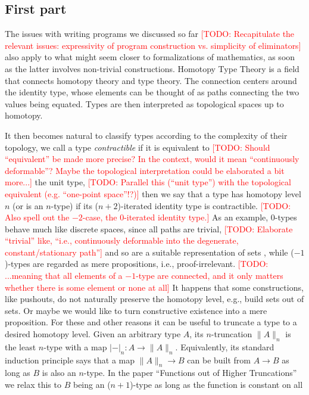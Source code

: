 \documentclass{book}
\newcommand{\TODO}[1]{\textcolor{red}{[TODO: #1]}}
\newcommand{\tr}[2]{\| #2 \|_{#1}}
\newcommand{\trcon}[2]{| #2 |_{#1}}
\begin{document}
\subsection{First part}
The issues with writing programs we discussed so far
\TODO{Recapitulate the relevant issues: expressivity of program construction vs. simplicity of eliminators}
also apply to
what might seem closer to formalizations of mathematics, as soon as the
latter involves non-trivial constructions.
Homotopy Type Theory \cite{hottbook} is a field that connects homotopy theory and type theory.
The connection centers around the identity type, whose elements can be
thought of as paths connecting the two values being equated. Types are
then interpreted as topological spaces up to homotopy.

It then becomes natural to classify types according to the complexity
of their topology, we call a type \emph{contractible} if it is
equivalent to \TODO{Should ``equivalent'' be made more precise?  In
  the context, would it mean ``continuously deformable''?  Maybe the
  topological interpretation could be elaborated a bit more...}
the unit type, \TODO{Parallel this (``unit type'') with the
  topological equivalent (e.g. ``one-point space''!?)}
then we say that a type has homotopy level $n$ (or is an
$n$-type) if its ($n{+}2$)-iterated identity type is contractible.
\TODO{Also spell out the $-2$-case, the $0$-iterated identity type.}
As an example,
$0$-types behave much like discrete spaces, since all paths are
trivial, \TODO{Elaborate ``trivial'' like, ``i.e., continuously
  deformable into the degenerate, constant/stationary path''}
and so are a suitable representation of sets \cite{rijkeSpitters:mscs15},
while ($-1$)-types are regarded as mere propositions, i.e.,
proof-irrelevant. \TODO{...meaning that all elements of a $-1$-type are
  connected, and it only matters whether there is some element or none
  at all}
It happens that some constructions, like pushouts, do not naturally
preserve the homotopy level, e.g., build sets out of sets.  Or maybe we
would like to turn constructive existence into a mere proposition.  For
these and other reasons it can be useful to truncate a type to a
desired homotopy level.
Given an arbitrary type $A$, its $n$-truncation $\tr{n}{A}$ is the least
$n$-type with a map $\trcon{n}{{-}} : A \to \tr{n}{A}$.  Equivalently, its standard
induction principle says that a map $\tr{n}{A} \to B$ can be built
from $A \to B$ as long as $B$ is also an $n$-type.
In the paper ``Functions out of Higher Truncations'' we relax this to
$B$ being an ($n{+}1$)-type as long as the function is constant on all
\end{document}
